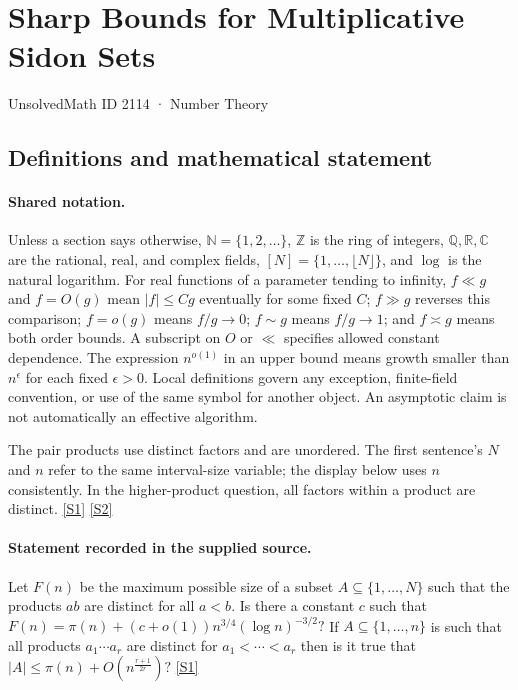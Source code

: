 \documentclass[11pt,a4paper]{article}
\newcommand{\N}{\mathbb{N}}
\newcommand{\Z}{\mathbb{Z}}
\newcommand{\Q}{\mathbb{Q}}
\newcommand{\R}{\mathbb{R}}
\newcommand{\C}{\mathbb{C}}
\newcommand{\sref}[2]{\hyperlink{source:#1:#2}{[S#2]}}
\begin{document}

\setcounter{section}{2113}

\section{Sharp Bounds for Multiplicative Sidon Sets}\label{2114}

{\small\sffamily UnsolvedMath ID 2114 · Number Theory}

\subsection{Definitions and mathematical statement}

\paragraph{Shared notation.}Unless a section says otherwise, $\N=\{1,2,\ldots\}$,
$\Z$ is the ring of integers, $\Q,\R,\C$ are the rational, real, and complex
fields, $[N]=\{1,\ldots,\lfloor N\rfloor\}$, and $\log$ is the natural
logarithm. For real functions of a parameter tending to infinity,
$f\ll g$ and $f=O(g)$ mean $|f|\leq Cg$ eventually for some fixed $C$;
$f\gg g$ reverses this comparison; $f=o(g)$ means $f/g\to0$;
$f\sim g$ means $f/g\to1$; and $f\asymp g$ means both order bounds.
A subscript on $O$ or $\ll$ specifies allowed constant dependence.
The expression $n^{o(1)}$ in an upper bound means growth smaller than
$n^\epsilon$ for each fixed $\epsilon>0$. Local definitions govern any
exception, finite-field convention, or use of the same symbol for another
object. An asymptotic claim is not automatically an effective algorithm.



The pair products use distinct factors and are unordered. The first sentence's $N$ and $n$ refer to the same interval-size variable; the display below uses $n$ consistently. In the higher-product question, all factors within a product are distinct. \sref{2114}{1} \sref{2114}{2}

\paragraph{Statement recorded in the supplied source.}
Let $F(n)$ be the maximum possible size of a subset $A\subseteq\{1,\ldots,N\}$ such that the products $ab$ are distinct for all $a<b$. Is there a constant $c$ such that $ F(n)=\pi(n)+(c+o(1))n^{3/4}(\log n)^{-3/2}? $ If $A\subseteq \{1,\ldots,n\}$ is such that all products $a_1\cdots a_r$ are distinct for $a_1<\cdots <a_r$ then is it true that $ \lvert A\rvert \leq \pi(n)+O(n^{\frac{r+1}{2r}})? $ \sref{2114}{1}
\end{document}
